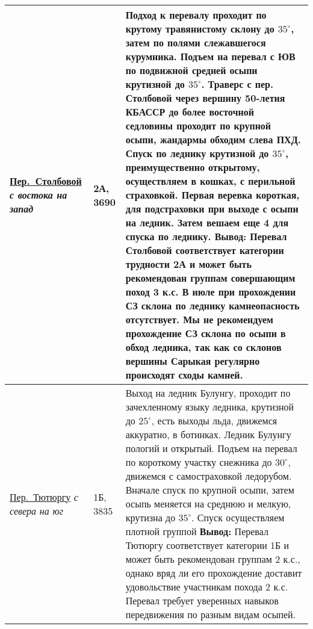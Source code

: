 {\begin{longtable}{|>{\centering\arraybackslash}m{3.8cm}|>{\centering\arraybackslash}m{1.3cm}|>{\raggedright\arraybackslash}m{12.5cm}|}
		 	\hyperref[subsec:Day11]{Пер.~Столбовой}																	\newline\textit{с востока на запад}		&	2А, 3690					&	Подход к перевалу проходит по крутому травянистому склону  до $35^\circ$, затем по полями слежавшегося курумника. Подъем на перевал с ЮВ по подвижной средней осыпи крутизной до $35^\circ$. Траверс с пер. Столбовой через вершину 50-летия КБАССР до более восточной седловины проходит по крупной осыпи, жандармы обходим слева ПХД. Спуск по леднику крутизной до $35^\circ$, преимущественно открытому, осуществляем в кошках, с перильной страховкой. Первая веревка короткая, для подстраховки при выходе с осыпи на ледник. Затем вешаем еще 4 для спуска по леднику. \newline \textbf{Вывод:} Перевал Столбовой соответствует категории трудности 2А и может быть рекомендован группам совершающим поход 3 к.с. В июле при прохождении СЗ склона по леднику камнеопасность отсутствует. Мы не рекомендуем прохождение СЗ склона по осыпи в обход ледника, так как со склонов вершины Сарыкая регулярно происходят сходы камней.																																																																																																																																																																																																																																																																															\\ \hline
			\hyperref[subsec:Day12]{Пер.~Тютюргу}																	\newline\textit{с севера на юг}			&	1Б, 3835					&	Выход на ледник Булунгу, проходит по зачехленному языку ледника, крутизной до $25^\circ$, есть выходы льда, движемся аккуратно, в ботинках. Ледник Булунгу пологий и открытый. Подъем на перевал по короткому участку снежника до $30^\circ$, движемся с самостраховкой ледорубом. Вначале спуск по крупной осыпи, затем осыпь меняется на среднюю и мелкую, крутизна до $35^\circ$. Спуск осуществляем плотной группой \newline \textbf{Вывод:} Перевал Тютюргу соответствует категории 1Б и может быть рекомендован группам 2 к.с., однако вряд ли его прохождение доставит удовольствие участникам похода 2 к.с. Перевал требует уверенных навыков передвижения по разным видам осыпей.																																																																																																																																																																																																																																																																																																																																																															\\ \hline

\end{longtable}}
